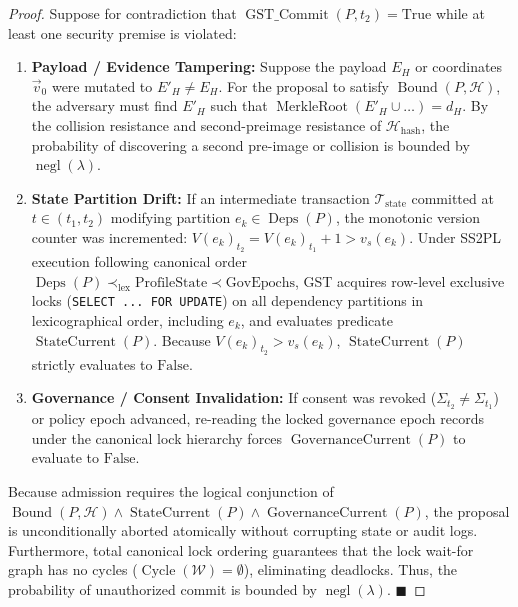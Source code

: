 \documentclass[runningheads]{llncs}
\begin{document}
\begin{proof}
Suppose for contradiction that $\operatorname{GST\_Commit}(P, t_2) = \text{True}$ while at least one security premise is violated:
\begin{enumerate}
    \item \textbf{Payload / Evidence Tampering:} Suppose the payload $E_H$ or coordinates $\vec{v}_0$ were mutated to $E'_H \neq E_H$. For the proposal to satisfy $\operatorname{Bound}(P, \mathcal{H})$, the adversary must find $E'_H$ such that $\operatorname{MerkleRoot}(E'_H \cup \dots) = d_H$. By the collision resistance and second-preimage resistance of $\mathcal{H}_{\text{hash}}$, the probability of discovering a second pre-image or collision is bounded by $\operatorname{negl}(\lambda)$.
    \item \textbf{State Partition Drift:} If an intermediate transaction $\mathcal{T}_{\text{state}}$ committed at $t \in (t_1, t_2)$ modifying partition $e_k \in \operatorname{Deps}(P)$, the monotonic version counter was incremented: $V(e_k)_{t_2} = V(e_k)_{t_1} + 1 > v_s(e_k)$. Under SS2PL execution following canonical order $\operatorname{Deps}(P) \prec_{\text{lex}} \text{ProfileState} \prec \text{GovEpochs}$, GST acquires row-level exclusive locks (\texttt{SELECT ... FOR UPDATE}) on all dependency partitions in lexicographical order, including $e_k$, and evaluates predicate $\operatorname{StateCurrent}(P)$. Because $V(e_k)_{t_2} > v_s(e_k)$, $\operatorname{StateCurrent}(P)$ strictly evaluates to $\text{False}$.
    \item \textbf{Governance / Consent Invalidation:} If consent was revoked ($\Sigma_{t_2} \neq \Sigma_{t_1}$) or policy epoch advanced, re-reading the locked governance epoch records under the canonical lock hierarchy forces $\operatorname{GovernanceCurrent}(P)$ to evaluate to $\text{False}$.
\end{enumerate}
Because admission requires the logical conjunction of $\operatorname{Bound}(P, \mathcal{H}) \land \operatorname{StateCurrent}(P) \land \operatorname{GovernanceCurrent}(P)$, the proposal is unconditionally aborted atomically without corrupting state or audit logs. Furthermore, total canonical lock ordering guarantees that the lock wait-for graph has no cycles ($\operatorname{Cycle}(\mathcal{W}) = \emptyset$), eliminating deadlocks. Thus, the probability of unauthorized commit is bounded by $\operatorname{negl}(\lambda)$. $\blacksquare$
\end{proof}
\end{document}
